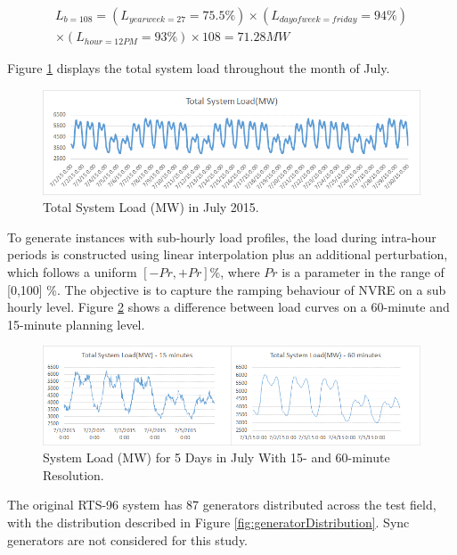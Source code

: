 \documentclass[12pt,LUDisStyle,twosided]{book}
\begin{document}
\begin{multline}
L_{b = 108} =  (L_{yearweek = 27} = 75.5\%) \times (L_{dayofweek = friday} = 94\%) 
\\ \times (L_{hour= 12 PM} = 93\%) \times 108 = 71.28MW
\end{multline}

Figure \ref{fig:totalSystemLoadJuly} displays the total system load throughout the month of July.

\begin{figure}[H] 
  \includegraphics[width=\textwidth,height=\textheight,keepaspectratio]{totalSystemLoadJuly.png}
  \caption{Total System Load (MW) in July 2015.}
  \label{fig:totalSystemLoadJuly}
\end{figure}

To generate instances with sub-hourly load profiles, the load during intra-hour periods is constructed using linear interpolation plus an additional perturbation, which follows a uniform $[-Pr,+Pr]\%$, where $Pr$ is a parameter in the range of [0,100] \%. The objective is to capture the ramping behaviour of NVRE on a sub hourly level. Figure \ref{fig:perturbationDifference} shows a difference between load curves on a 60-minute and 15-minute planning level. 

\begin{figure}[H] 
  \includegraphics[width=\textwidth,height=\textheight,keepaspectratio]{perturbationDifference.png}
  \caption{System Load (MW) for 5 Days in July With 15- and 60-minute Resolution.}
  \label{fig:perturbationDifference}
\end{figure}

The original RTS-96 system has 87 generators distributed across the test field, with the distribution described in Figure \ref{fig:generatorDistribution}. Sync generators are not considered for this study.
\end{document}
